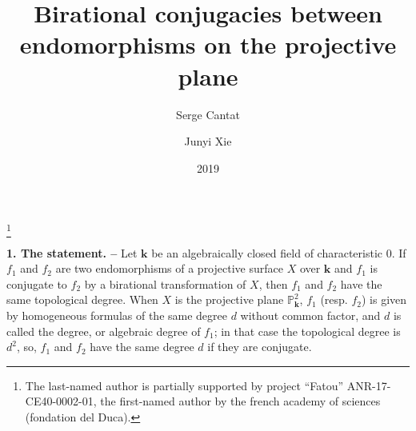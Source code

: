 \documentclass[reqno,oneside,12pt]{amsart}
\theoremstyle{plain}
\theoremstyle{definition}
\def\bfk{{\mathbf{k}}}
\def\P{\mathbb{P}}
\begin{document}
\setlength{\baselineskip}{0.53cm}        %
%
%
\title[]
{Birational conjugacies between endomorphisms on the projective plane}
\date{2019}

\author{Serge Cantat}
\address{Serge Cantat, IRMAR, Campus de Beaulieu,
b\^atiments 22-23
263 avenue du G\'en\'eral Leclerc, CS 74205
35042  RENNES C\'edex}

\author{Junyi Xie}
\address{Junyi Xie, IRMAR, Campus de Beaulieu,
b\^atiments 22-23
263 avenue du G\'en\'eral Leclerc, CS 74205
35042  RENNES C\'edex}

\thanks{The last-named author is partially supported by project ``Fatou'' ANR-17-CE40-0002-01, the first-named author by the french academy of sciences (fondation del Duca). }

%
%

\maketitle
 


%
% 
%
%







 

{\noindent}{\bf{1. The statement. --}} Let $\bfk$ be an algebraically closed field of characteristic $0$. If $f_1$ and 
$f_2$ are two endomorphisms of a projective surface $X$ over $\bfk$ and  $f_1$ is conjugate to $f_2$
by a birational transformation of $X$, then $f_1$ and $f_2$ have the same topological degree. 
When $X$ is the projective plane $\P^2_\bfk$, $f_1$ (resp. $f_2$) is given by homogeneous formulas of the same degree $d$ without common 
factor, and $d$ is called the degree, or algebraic degree of $f_1$; in that case the topological degree is $d^2$, so, $f_1$ and $f_2$ have the same degree $d$ if they are conjugate. 
\end{document}
